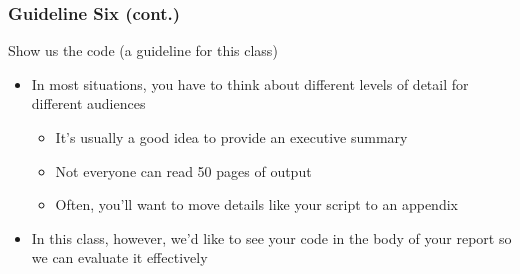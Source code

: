 \documentclass[12pt, block=fill]{beamer}
\begin{document}
\begin{frame}
  \frametitle{Guideline Six (cont.)}
  \begin{exampleblock}{Show us the code (a guideline for this class)}
    \begin{itemize}
      \item In most situations, you have to think about different levels of detail for different audiences
      \begin{itemize}
        \item It's usually a good idea to provide an executive summary
        \item Not everyone can read 50 pages of output
        \item Often, you'll want to move details like your script to an appendix
      \end{itemize}
      \item In this class, however, we'd like to see your code in the body of your report so we can evaluate it effectively
    \end{itemize}
  \end{exampleblock}
\end{frame}
\end{document}
